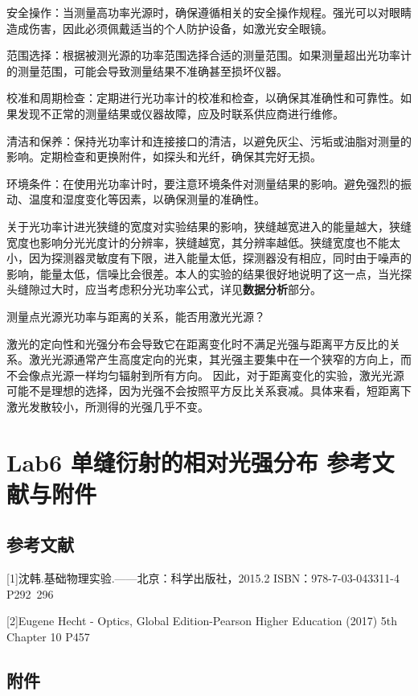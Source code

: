 \documentclass[dvipsnames, svgnames,a4paper,11pt]{article}
\begin{document}
	安全操作：当测量高功率光源时，确保遵循相关的安全操作规程。强光可以对眼睛造成伤害，因此必须佩戴适当的个人防护设备，如激光安全眼镜。
	
	范围选择：根据被测光源的功率范围选择合适的测量范围。如果测量超出光功率计的测量范围，可能会导致测量结果不准确甚至损坏仪器。
	
	校准和周期检查：定期进行光功率计的校准和检查，以确保其准确性和可靠性。如果发现不正常的测量结果或仪器故障，应及时联系供应商进行维修。
	
	清洁和保养：保持光功率计和连接接口的清洁，以避免灰尘、污垢或油脂对测量的影响。定期检查和更换附件，如探头和光纤，确保其完好无损。
	
	环境条件：在使用光功率计时，要注意环境条件对测量结果的影响。避免强烈的振动、温度和湿度变化等因素，以确保测量的准确性。
	
	关于光功率计进光狭缝的宽度对实验结果的影响，狭缝越宽进入的能量越大，狭缝宽度也影响分光光度计的分辨率，狭缝越宽，其分辨率越低。狭缝宽度也不能太小，因为探测器灵敏度有下限，进入能量太低，探测器没有相应，同时由于噪声的影响，能量太低，信噪比会很差。本人的实验的结果很好地说明了这一点，当光探头缝隙过大时，应当考虑积分光功率公式，详见\textbf{数据分析}部分。
	
	\begin{question}
		测量点光源光功率与距离的关系，能否用激光光源？
	\end{question}
	激光的定向性和光强分布会导致它在距离变化时不满足光强与距离平方反比的关系。激光光源通常产生高度定向的光束，其光强主要集中在一个狭窄的方向上，而不会像点光源一样均匀辐射到所有方向。
	因此，对于距离变化的实验，激光光源可能不是理想的选择，因为光强不会按照平方反比关系衰减。具体来看，短距离下激光发散较小，所测得的光强几乎不变。
	
		
	\clearpage
	\section{Lab6 单缝衍射的相对光强分布 \quad\heiti 参考文献与附件}
	\subsection{参考文献}
	[1]沈韩.基础物理实验.——北京：科学出版社，2015.2 ISBN：978-7-03-043311-4 P292~296
	
	[2]Eugene Hecht - Optics, Global Edition-Pearson Higher Education (2017) 5th Chapter 10 P457
	
	\clearpage
	\subsection{附件}
	
\end{document}
